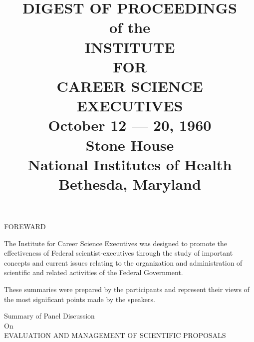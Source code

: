 \documentclass{memoir}
\title{%
  DIGEST OF PROCEEDINGS \\
  of the \\
  INSTITUTE \\
  FOR \\
  CAREER SCIENCE EXECUTIVES \\
  \large October 12 --- 20, 1960 \\
         Stone House \\
         National Institutes of Health \\
         Bethesda, Maryland
}
\begin{document}
\maketitle

\begin{vplace}[0.7]
\begin{center}
FOREWARD
\end{center}
The Institute for Career Science Executives was designed to promote the effectiveness of Federal scientist-executives through the study of important concepts and current issues relating to the organization and administration of scientific and related activities of the Federal Government.

These summaries were prepared by the participants and represent their views of the most significant points made by the speakers.
\end{vplace}

\pagebreak

\begin{center}
Summary of Panel Discussion \\
On \\
EVALUATION AND MANAGEMENT OF SCIENTIFIC PROPOSALS
\end{center}

\vspace{1cm}
\end{document}
